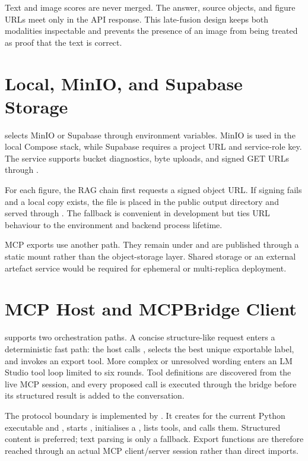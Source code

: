 Text and image scores are never merged. The answer, source objects, and figure URLs meet only in the API response. This late-fusion design keeps both modalities inspectable and prevents the presence of an image from being treated as proof that the text is correct.

\section{Local, MinIO, and Supabase Storage}
\label{sec:storage}

 selects MinIO or Supabase through environment variables. MinIO is used in the local Compose stack, while Supabase requires a project URL and service-role key. The service supports bucket diagnostics, byte uploads, and signed GET URLs through .

For each figure, the RAG chain first requests a signed object URL. If signing fails and a local copy exists, the file is placed in the public output directory and served through . The fallback is convenient in development but ties URL behaviour to the environment and backend process lifetime.

MCP exports use another path. They remain under  and are published through a static mount rather than the object-storage layer. Shared storage or an external artefact service would be required for ephemeral or multi-replica deployment.

\section{MCP Host and MCPBridge Client}
\label{sec:mcp-host-client}

 supports two orchestration paths. A concise structure-like request enters a deterministic fast path: the host calls , selects the best unique exportable label, and invokes an export tool. More complex or unresolved wording enters an LM Studio tool loop limited to six rounds. Tool definitions are discovered from the live MCP session, and every proposed call is executed through the bridge before its structured result is added to the conversation.

The protocol boundary is implemented by . It creates  for the current Python executable and , starts , initialises a , lists tools, and calls them. Structured content is preferred; text parsing is only a fallback. Export functions are therefore reached through an actual MCP client/server session rather than direct imports.

